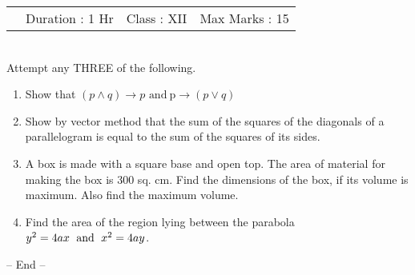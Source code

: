\documentclass[14pt,a4paper]{extarticle}
\begin{document}
\hspace{-0.5cm} 
\begin{tabu} to \textwidth { X[l] X[c] X[r]}
\ \  Duration : 1 Hr & Class : XII  & Max Marks : 15\\
\end{tabu} \\

  
 Attempt any THREE of the following.  
\begin{enumerate}
\item Show that 
$(p \wedge q)\to p$ $ \text{and} \ $p$ \to(p \vee q)$  
\item Show by vector method that the sum of the squares of the diagonals of a parallelogram is equal to the sum of the squares of its sides.
\item A box is made with a square base and open top. The area of material for making the box is 300 sq. cm. Find the dimensions of the box, if its volume is maximum. Also find the maximum volume.
\item Find the area of the region lying between the parabola\quad$y^2 = 4ax \text{\; and \;} x^2=4ay$\;.
\end{enumerate}
\begin{center} -- End --   \end{center}
\end{document}
